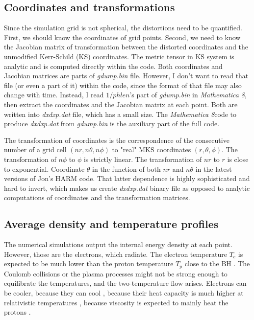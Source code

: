 \documentclass{emulateapj}
\newcommand{\mat}{\textit{Mathematica 8}}
\begin{document}
\subsection{Coordinates and transformations}
Since the simulation grid is not spherical, the distortions need to be quantified.
First, we should know the coordinates of grid points. Second, we need to know the Jacobian matrix of transformation between the distorted coordinates and the unmodified Kerr-Schild (KS) coordinates. The metric tensor in KS system is analytic and is computed directly within the code.
Both coordinates and Jacobian matrices are parts of \textit{gdump.bin} file. However, I don't want to read that file (or even a part of it) within the code, since the format of that file
may also change with time. Instead, I read $1/phlen$'s part of \textit{gdump.bin} in \mat, then extract the coordinates and the Jacobian matrix at each point.
Both are written into \textit{dxdxp.dat} file, which has a small size.
The \mat code to produce \textit{dxdxp.dat} from \textit{gdump.bin} is the auxiliary part of the full code.

The transformation of coordinates is the correspondence of the consecutive number of a grid cell $(nr,n\theta,n\phi)$ to "real" MKS coordinates $(r,\theta,\phi)$.
The transformation of $n\phi$ to $\phi$ is strictly linear. The transformation of $nr$ to $r$ is close to exponential.
Coordinate $\theta$ in the function of both $nr$ and $n\theta$ in the latest versions of Jon's HARM code.
That latter dependence is highly sophisticated and hard to invert, which makes us create \textit{dxdxp.dat} binary file as opposed to analytic computations of coordinates and the transformation matrices.

\subsection{Average density and temperature profiles}
The numerical simulations output the internal energy density at each point. However, those are the electrons, which radiate.
The electron temperature $T_e$ is expected to be much lower than the proton temperature $T_p$ close to the BH \citep{Narayan:1995kj}. The Coulomb collisions or the plasma processes might not be strong enough to equilibrate the temperatures, and the two-temperature flow arises.
Electrons can be cooler, because they can cool \citep{Drappeau:2012dq}, because their heat capacity is much higher at relativistic temperatures \citep{Shcherbakov:2010cond}, because
viscosity is expected to mainly heat the protons \citep{Narayan:1995kj,Sharma_heating:2007}.
\end{document}
